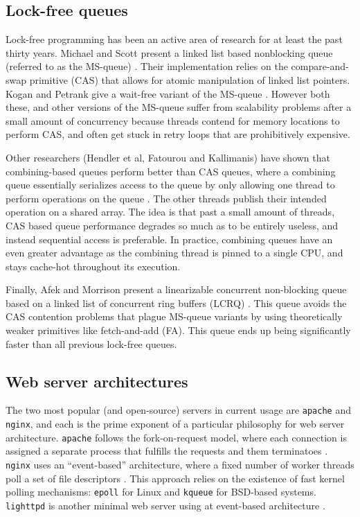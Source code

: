 \documentclass[twoside,10pt]{article}
\begin{document}
\begin{multicols}{2}
\subsection{Lock-free queues}

Lock-free programming has been an active area of research for at least
the past thirty years. Michael and Scott present a linked list based
nonblocking queue (referred to as the MS-queue) \cite{MS96}. Their
implementation relies on the compare-and-swap primitive (CAS) that
allows for atomic manipulation of linked list pointers. Kogan and
Petrank give a wait-free variant of the MS-queue \cite{KP11}. However
both these, and other versions of the MS-queue suffer from scalability
problems after a small amount of concurrency because threads contend
for memory locations to perform CAS, and often get stuck in retry
loops that are prohibitively expensive.

Other researchers (Hendler et al, Fatourou and Kallimanis) have shown
that combining-based queues perform better than CAS queues, where a
combining queue essentially serializes access to the queue by only
allowing one thread to perform operations on the queue \cite{He10,
  FK12}. The other threads publish their intended operation on a
shared array. The idea is that past a small amount of threads, CAS
based queue performance degrades so much as to be entirely useless,
and instead sequential access is preferable. In practice, combining
queues have an even greater advantage as the combining thread is
pinned to a single CPU, and stays cache-hot throughout its execution.

Finally, Afek and Morrison present a linearizable concurrent
non-blocking queue based on a linked list of concurrent ring buffers
(LCRQ) \cite{AM13}. This queue avoids the CAS contention problems that
plague MS-queue variants by using theoretically weaker primitives like
fetch-and-add (FA). This queue ends up being significantly faster than
all previous lock-free queues.

\subsection{Web server architectures}

The two most popular (and open-source) servers in current usage are
\verb+apache+ and \verb+nginx+, and each is the prime exponent of a
particular philosophy for web server architecture. \verb+apache+
follows the fork-on-request model, where each connection is assigned a
separate process that fulfills the requests and them terminatoes
\cite{fielding1997apache}. \verb+nginx+ uses an ``event-based''
architecture, where a fixed number of worker threads poll a set of
file descriptors \cite{syosevnginx}. This approach relies on the
existence of fast kernel polling mechanisms: \verb+epoll+ for Linux
and \verb+kqueue+ for BSD-based systems. \verb+lighttpd+ is another
minimal web server using at event-based architecture
\cite{kneschke2003lighttpd}.


\end{multicols}
\end{document}
